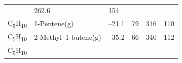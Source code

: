 \documentclass[
  9pt,
]{extbook}
\theoremstyle{definition}
\theoremstyle{definition}
\theoremstyle{definition}
\theoremstyle{remark}
\begin{document}
\begin{longtable}[]{@{}llllll@{}}
\begin{minipage}[t]{0.15\columnwidth}
\strut
\end{minipage} & \begin{minipage}[t]{0.14\columnwidth}\raggedright
262.6\strut
\end{minipage} & \begin{minipage}[t]{0.14\columnwidth}\raggedright
154\strut
\end{minipage}\tabularnewline
\begin{minipage}[t]{0.07\columnwidth}\raggedright
C\textsubscript{5}H\textsubscript{10}\strut
\end{minipage} & \begin{minipage}[t]{0.17\columnwidth}\raggedright
1-Pentene(g)\strut
\end{minipage} & \begin{minipage}[t]{0.15\columnwidth}\raggedright
--21.1\strut
\end{minipage} & \begin{minipage}[t]{0.15\columnwidth}\raggedright
79\strut
\end{minipage} & \begin{minipage}[t]{0.14\columnwidth}\raggedright
346\strut
\end{minipage} & \begin{minipage}[t]{0.14\columnwidth}\raggedright
110\strut
\end{minipage}\tabularnewline
\begin{minipage}[t]{0.07\columnwidth}\raggedright
C\textsubscript{5}H\textsubscript{10}\strut
\end{minipage} & \begin{minipage}[t]{0.17\columnwidth}\raggedright
2-Methyl--1-butene(g)\strut
\end{minipage} & \begin{minipage}[t]{0.15\columnwidth}\raggedright
--35.2\strut
\end{minipage} & \begin{minipage}[t]{0.15\columnwidth}\raggedright
66\strut
\end{minipage} & \begin{minipage}[t]{0.14\columnwidth}\raggedright
340\strut
\end{minipage} & \begin{minipage}[t]{0.14\columnwidth}\raggedright
112\strut
\end{minipage}\tabularnewline
\begin{minipage}[t]{0.07\columnwidth}\raggedright
C\textsubscript{5}H\textsubscript{10}\strut
\end{minipage} & \begin{minipage}[t]{0.17\columnwidth}\raggedright

\end{minipage}
\end{longtable}
\end{document}
